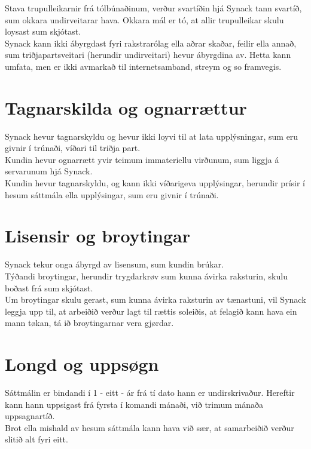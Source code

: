\noindent
Stava trupulleikarnir frá tólbúnaðinum, verður svartíðin hjá Synack tann svartíð, sum okkara
undirveitarar hava. Okkara mál er tó, at allir trupulleikar skulu loysast sum skjótast. \\

\noindent
Synack kann ikki ábyrgdast fyri rakstrarólag ella aðrar skaðar, feilir ella annað, sum triðjapartsveitari
(herundir undirveitari) hevur ábyrgdina av. Hetta kann umfata, men er ikki avmarkað til
internetsamband, streym og so framvegis.

\section*{Tagnarskilda og ognarrættur}
Synack hevur tagnarskyldu og hevur ikki loyvi til at lata upplýsningar, sum eru givnir í trúnaði, víðari
til triðja part. \\
Kundin hevur ognarrætt yvir teimum immateriellu virðunum, sum liggja á servarunum hjá Synack. \\
Kundin hevur tagnarskyldu, og kann ikki víðarigeva upplýsingar, herundir prísir í hesum sáttmála ella
upplýsingar, sum eru givnir í trúnaði.\\

\section*{Lisensir og broytingar}
Synack tekur onga ábyrgd av lisensum, sum kundin brúkar. \\
Týðandi broytingar, herundir trygdarkrøv sum kunna ávirka raksturin, skulu boðast frá sum skjótast. \\
Um broytingar skulu gerast, sum kunna ávirka raksturin av tænastuni, vil Synack leggja upp til, at
arbeiðið verður lagt til rættis soleiðis, at felagið kann hava ein mann tøkan, tá ið broytingarnar vera
gjørdar. \\

\section*{Longd og uppsøgn}
Sáttmálin er bindandi í 1 - eitt - ár frá tí dato hann er undirskrivaður. Hereftir kann hann uppsigast frá
fyrsta í komandi mánaði, við trimum mánaða uppsagnartíð. \\

\noindent
Brot ella mishald av hesum sáttmála kann hava við sær, at samarbeiðið verður slitið alt fyri eitt. \\

